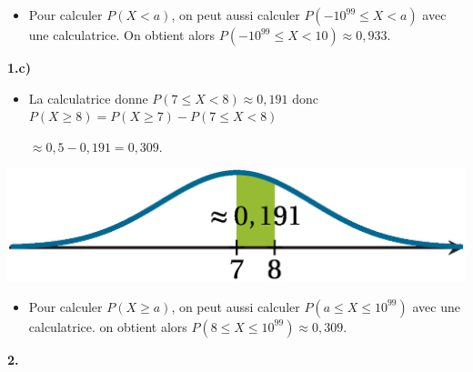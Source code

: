 \documentclass{cornouaille}
\begin{document}
\begin{methode}
\begin{minipage}{0.4\linewidth}
\end{minipage}


\begin{itemize}\smallskip
\item Pour calculer $P(X<a)$, on peut aussi calculer $P\left(-10^{99}\leqslant X<a \right)$ avec une calculatrice. On obtient alors $P\left(-10^{99}\leqslant X< 10 \right)\approx0,933.$
\end{itemize}



\textbf{1.c) } ~~





\begin{minipage}{0.6\linewidth}

\begin{itemize}
\item La calculatrice donne $P(7\leqslant X<8)\approx 0,191$ donc
$P(X\geqslant 8)=P(X\geqslant 7)-P(7\leqslant X < 8)$

$\approx 0,5-0,191=0,309$.
\end{itemize}

\end{minipage}

\hfill

\begin{minipage}{0.4\linewidth}



\includegraphics{./TS-Variables-12}



\end{minipage}


\begin{itemize}\smallskip
\item Pour calculer $P(X\geqslant a)$, on peut aussi calculer
$P\left(a\leqslant X\leqslant 10^{99}\right)$ avec une calculatrice. on obtient alors $P\left(8\leqslant X\leqslant 10^{99} \right)\approx0,309.$
\end{itemize}





\textbf{2. }





\end{methode}
\end{document}

